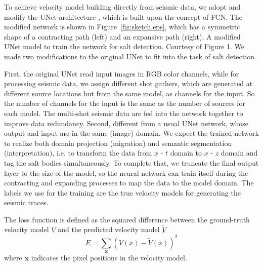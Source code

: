 \documentclass{segabs}
\begin{document}
To achieve velocity model building directly from seismic data, we adopt and modify the UNet architecture \citep{ronneberger15}, which is built upon the concept of FCN. The modified network is shown in Figure~\ref{fig:sketch.eps}, which has a symmetric shape of a contracting path (left) and an expansive path (right).
{A modified UNet model to train the network for salt detection. Courtesy of \citet{ronneberger15} Figure 1.}
We made two modifications to the original UNet to fit into the task of salt detection. 

First, the original UNet read input images in RGB color channels, while for processing seismic data, we assign different shot gathers, which are generated at different source locations but from the same model, as channels for the input. So the number of channels for the input is the same as the number of sources for each model. The multi-shot seismic data are fed into the network together to improve data redundancy. Second, different from a usual UNet network, whose output and input are in the same (image) domain. We expect the trained network to realize both domain projection (migration) and semantic segmentation (interpretation), i.e. to transform the data from $x$ - $t$ domain to $x$ - $z$ domain and tag the salt bodies simultaneously. To complete that, we truncate the final output layer to the size of the model, so the neural network can train itself during the contracting and expanding processes to map the data to the model domain.
The labels we use for the training are the true velocity models for generating the seismic traces.

The loss function is defined as the squared difference between the ground-truth velocity model $V$ and the predicted velocity model $\tilde{V}$
\begin{equation}
E = \sum_{\boldsymbol{x}} (V(x)-\tilde{V}(x))^2
\label{loss}
\end{equation}
where $\boldsymbol{x}$ indicates the pixel positions in the velocity model.
\end{document}

